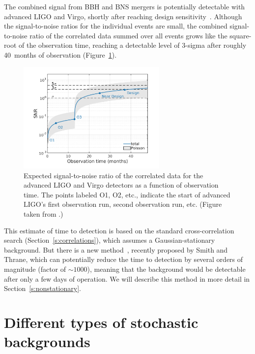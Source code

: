 The combined signal from BBH and BNS mergers is 
potentially detectable with advanced LIGO and Virgo, 
shortly after reaching design sensitivity~\cite{StochImplications:2018}.
Although the signal-to-noise ratios for the 
individual events are small, the combined 
signal-to-noise ratio of the correlated data 
summed over all events grows like the square-root 
of the observation time, reaching a detectable
level of $3$-sigma after roughly 40~months of
observation (Figure~\ref{f:BBH-BNS-SNR}).
%
\begin{figure}[htbp!]
\begin{center}
\includegraphics[width=0.65\textwidth]{Figures/BBH-BNS-SNR}
\caption{Expected signal-to-noise ratio of the correlated
data for the advanced LIGO and Virgo detectors as a function 
of observation time.
The points labeled O1, O2, etc., indicate the start of
advanced LIGO's first observation run, second observation
run, etc. 
(Figure taken from \cite{StochImplications:2018}.)}
\label{f:BBH-BNS-SNR}
\end{center}
\end{figure}
%
This estimate of time to detection is based on 
the standard cross-correlation search (Section~\ref{s:correlations}), 
which assumes a Gaussian-stationary background.
But there is a new method~\cite{Smith-Thrane:2018}, 
recently proposed by Smith and Thrane,
which can potentially reduce the time to detection by several 
orders of magnitude (factor of $\sim\!1000$), 
meaning that the background would be detectable after only
a few days of operation. 
We will describe this method in more detail in 
Section~\ref{s:nonstationary}.

\section{Different types of stochastic backgrounds}
\label{s:different_types}

